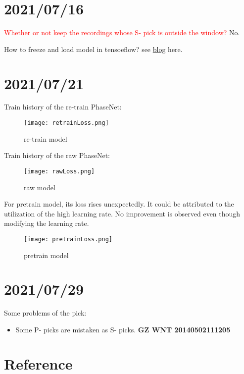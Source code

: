 \documentclass{article}
\begin{document}
\section{2021/07/16}
\par{\textcolor{red}{Whether or not keep the recordings whose S- pick is outside the window?} No.}
\par{How to freeze and load model in tensoeflow? see \href{https://blog.metaflow.fr/tensorflow-how-to-freeze-a-model-and-serve-it-with-a-python-api-d4f3596b3adc}{blog} here.}
\section{2021/07/21}
\par{Train history of the re-train PhaseNet:}
\begin{figure}[H]
  \centering
  \texttt{[image: retrainLoss.png]}
  \caption{re-train model}
  \label{fig:<+label+>}
\end{figure}

\par{Train history of the raw PhaseNet:}
\begin{figure}[H]
  \centering
  \texttt{[image: rawLoss.png]}
  \caption{raw model}
  \label{fig:<+label+>}
\end{figure}

\par{For pretrain model, its loss rises unexpectedly. It could be attributed to the utilization of the high learning rate. No improvement is observed even though modifying the learning rate.}
\begin{figure}[H]
  \centering
  \texttt{[image: pretrainLoss.png]}
  \caption{pretrain model}
  \label{fig:<+label+>}
\end{figure}

\section{2021/07/29}
\par{Some problems of the pick:}
\begin{itemize}
  \item Some P- picks are mistaken as S- picks. \textbf{GZ WNT 20140502111205}
\end{itemize}
\section{Reference}
\end{document}
